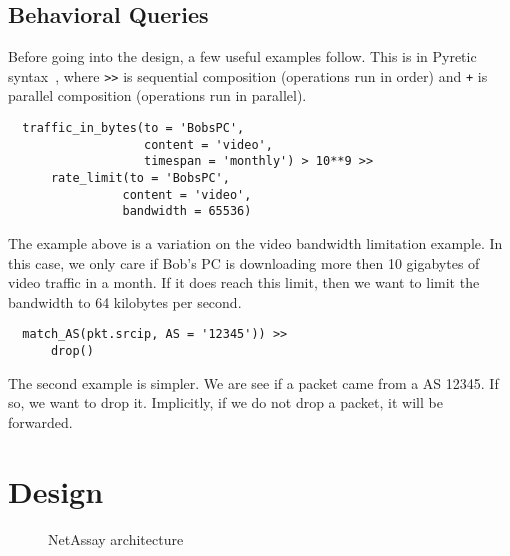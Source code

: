 \documentclass{sig-alternate}
\newcommand\tti[1]{\small\texttt{#1}\normalsize}
\newcommand\system{NetAssay}
\begin{document}
\subsection{Behavioral Queries}
Before going into the design, a few useful examples follow. This is in Pyretic syntax~\cite{pyretic}, where \tti{>}\tti{>} is sequential composition (operations run in order) and \tti{+} is parallel composition (operations run in parallel). 

\begin{verbatim}
  traffic_in_bytes(to = 'BobsPC', 
                   content = 'video',
                   timespan = 'monthly') > 10**9 >>
      rate_limit(to = 'BobsPC', 
                content = 'video', 
                bandwidth = 65536)
\end{verbatim}

The example above is a variation on the video bandwidth limitation example. In this case, we only care if Bob's PC is downloading more then 10 gigabytes of video traffic in a month. If it does reach this limit, then we want to limit the bandwidth to 64 kilobytes per second.

\begin{verbatim}
  match_AS(pkt.srcip, AS = '12345')) >>
      drop()
\end{verbatim}

The second example is simpler. We are see if a packet came from a AS 12345. If so, we want to drop it. Implicitly, if we do not drop a packet, it will be forwarded.


\section{Design}


\begin{figure}
    \centering
    \caption{\system{} architecture}
    \label{fig:architecture}
\end{figure}
\end{document}
